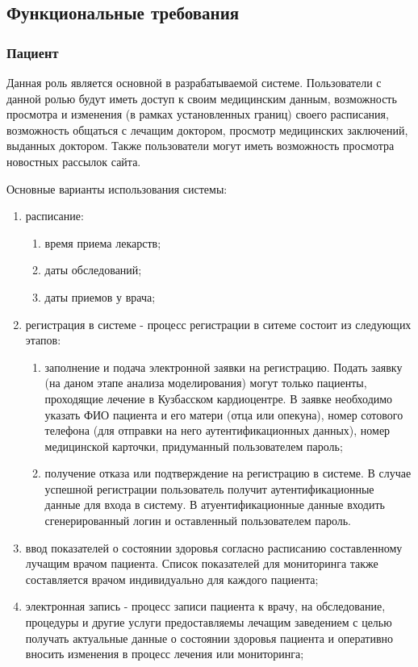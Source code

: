 \subsection{Функциональные требования}
\subsubsection{Пациент}
Данная роль является основной в разрабатываемой системе. Пользователи с данной
ролью будут иметь доступ к своим медицинским данным, возможность просмотра и
изменения (в рамках установленных границ) своего расписания, возможность
общаться с лечащим доктором, просмотр медицинских заключений, выданных доктором.
Также пользователи могут иметь возможность просмотра новостных рассылок сайта.

Основные варианты использования системы:

\begin{enumerate}
  \item расписание:
  \begin{enumerate}
    \item время приема лекарств;
    \item даты обследований;
    \item даты приемов у врача;     
  \end{enumerate}
  \item регистрация в системе - процесс регистрации в ситеме состоит из
  следующих этапов:
  \begin{enumerate}
    \item заполнение и подача электронной заявки на регистрацию. Подать заявку
    (на даном этапе анализа моделирования) могут только пациенты, проходящие
    лечение в Кузбасском кардиоцентре. 
    В заявке необходимо указать ФИО пациента и его матери (отца или опекуна), номер сотового телефона (для отправки на него аутентификационных данных), номер медицинской карточки, придуманный пользователем пароль;
    \item получение отказа или подтверждение на регистрацию в системе. В случае
    успешной регистрации пользователь получит аутентификационные данные для
    входа в систему. В атуентификационные данные входить сгенерированный логин и
    оставленный пользователем пароль.
  \end{enumerate}
  \item ввод показателей о состоянии здоровья согласно расписанию составленному
лучащим врачом пациента. Список показателей для мониторинга также составляется
врачом индивидуально для каждого пациента;
  \item электронная запись - процесс записи пациента к врачу, на обследование,
процедуры и другие услуги предоставляемы лечащим заведением с целью получать
актуальные данные о состоянии здоровья пациента и оперативно вносить изменения в процесс лечения или мониторинга;
\end{enumerate}






